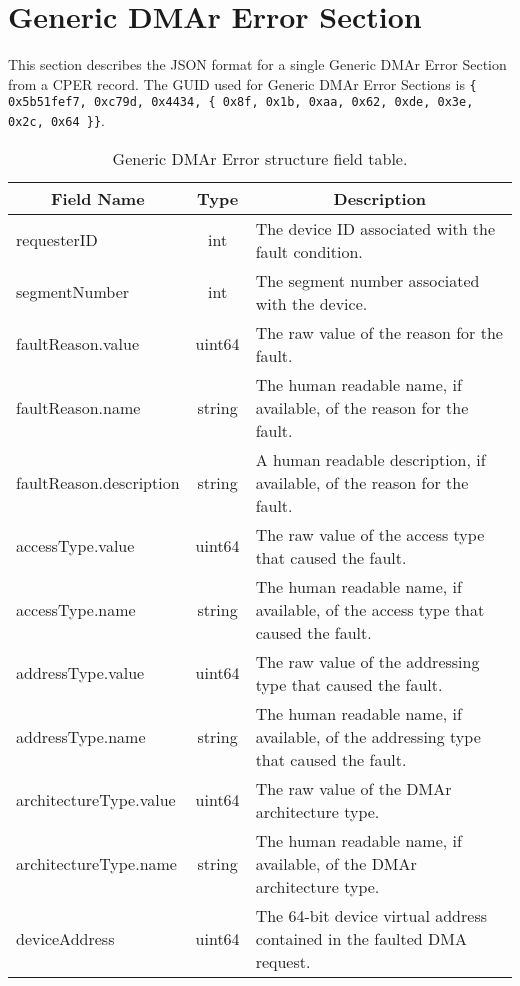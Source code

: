 \documentclass{report}
\newcommand*{\thead}[1]{\multicolumn{1}{|c|}{\bfseries #1}}
\newcommand*{\jsontable}[1]{
    \begin{table}[!ht]
    \label{#1}
    \centering
    \begin{adjustbox}{center}
    \begin{tabular}{|l|c|p{8cm}|}
    \hline
    \thead{Field Name} & \thead{Type} & \thead{Description} \\
    \hline
}
\newcommand*{\jsontableend}[1]{
    \hline
    \end{tabular}
    \end{adjustbox}
    \caption{#1}
    \label{table:#1}
    \end{table}
    \FloatBarrier
}
\begin{document}
\section{Generic DMAr Error Section}
\label{section:dmargenericerrorsection}
This section describes the JSON format for a single Generic DMAr Error Section from a CPER record. The GUID used for Generic DMAr Error Sections is \texttt{\{ 0x5b51fef7, 0xc79d, 0x4434, \{ 0x8f, 0x1b, 0xaa, 0x62, 0xde, 0x3e, 0x2c, 0x64 \}\}}.
\jsontable{table:dmargenericerrorsection}
requesterID & int & The device ID associated with the fault condition.\\
\hline
segmentNumber & int & The segment number associated with the device.\\
\hline
faultReason.value & uint64 & The raw value of the reason for the fault.\\
faultReason.name & string & The human readable name, if available, of the reason for the fault.\\
faultReason.description & string & A human readable description, if available, of the reason for the fault.\\
\hline
accessType.value & uint64 & The raw value of the access type that caused the fault.\\
accessType.name & string & The human readable name, if available, of the access type that caused the fault.\\
\hline
addressType.value & uint64 & The raw value of the addressing type that caused the fault.\\
addressType.name & string & The human readable name, if available, of the addressing type that caused the fault.\\
\hline
architectureType.value & uint64 & The raw value of the DMAr architecture type.\\
architectureType.name & string & The human readable name, if available, of the DMAr architecture type.\\
\hline
deviceAddress & uint64 & The 64-bit device virtual address contained in the faulted DMA request.\\
\jsontableend{Generic DMAr Error structure field table.}

\end{document}
